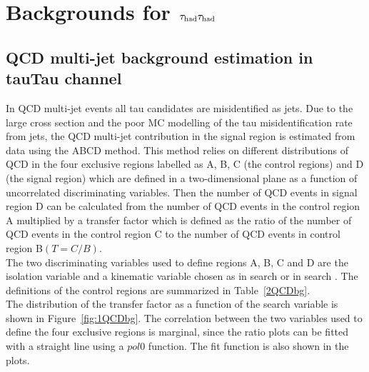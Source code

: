 \section{\texorpdfstring{Backgrounds for $\,\tau_{\rm had}\tau_{\rm had}$}{Backgrounds for tauTau}}
\label{sect:bkg}
\subsection{QCD multi-jet background estimation in tauTau channel}
In QCD multi-jet events all tau candidates are misidentified as jets. Due to the large cross
section and
the poor MC modelling of the tau misidentification rate from jets, the QCD multi-jet contribution in the signal region 
is estimated from data using the ABCD method.
This method relies on different distributions of QCD
in the four exclusive regions labelled as A, B, C (the control regions) and D (the signal region) which are defined in a two-dimensional plane as a function of uncorrelated discriminating variables.
Then the number of QCD events in signal region D can be calculated from the number of QCD events in the control region A multiplied by a transfer factor which is defined as the ratio of the number of QCD events in the control region C to the number of QCD events in control region B$(T=C/B)$.\\
The two discriminating variables used to define regions A, B, C and D are the isolation 
variable and a kinematic variable chosen as \mttwo in search \binone or \SumMT in search \bintwo.  
The definitions of the control regions are summarized in Table~\ref{2QCDbg}. \\
The distribution of the transfer factor as a 
function of the search variable is shown in Figure~\ref{fig:1QCDbg}. The correlation 
between the two variables used to define the four exclusive regions is marginal, since the ratio plots can be fitted with a straight line using a $pol0$ function. The fit function is also shown in the plots. 
